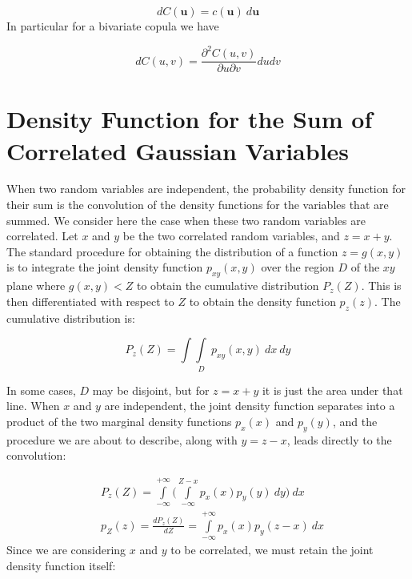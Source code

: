\documentclass{article}
\begin{document}
\begin{equation}
dC(\mathbf{u}) = c(\mathbf{u}) \> d \mathbf{u}
\end{equation}
In particular for a bivariate copula we have

\begin{equation}
dC(u, v) = \frac{\partial^2 C(u, v)}{\partial u \partial v} du dv
\end{equation}
%
%
\section{Density Function for the Sum of Correlated Gaussian Variables}

When two random variables are independent, the probability density function for their sum is the
convolution of the density functions for the variables that are summed. We consider here the case
when these two random variables are correlated. Let $x$ and $y$ be the two correlated random variables,
and $z = x + y$. The standard procedure for obtaining the distribution of a function $z = g(x,y)$ is to
integrate the joint density function $p_{xy}(x,y)$ over the region $D$ of the $xy$ plane where $g(x,y) < Z$ to
obtain the cumulative distribution $P_z(Z)$. This is then differentiated with respect to $Z$ to obtain the
density function $p_z(z)$. The cumulative distribution is:

\begin{equation}
    P_z(Z)= \int\int\limits_D \> p_{xy}(x,y) \>dx \>dy
\end{equation}

In some cases, $D$ may be disjoint, but for $z = x + y$ it is just the area under that line. When $x$ and $y$ are
independent, the joint density function separates into a product of the two marginal density functions
$p_x(x)$ and $p_y(y)$, and the procedure we are about to describe, along with $y = z - x$, leads directly to the
convolution:

\begin{equation}
    \begin{split}
        & P_z(Z) = \int\limits_{-\infty}^{+\infty} \Biggl( \int\limits_{-\infty}^{Z-x} p_x(x)p_y(y) \> dy \Biggr) \> dx \\
        & p_Z(z) = \frac{dP_z(Z)}{dZ} = \int\limits_{-\infty}^{+\infty} p_x(x)p_y(z-x) \> dx
    \end{split}
\end{equation}
Since we are considering $x$ and $y$ to be correlated, we must retain the joint density function itself:
\end{document}
